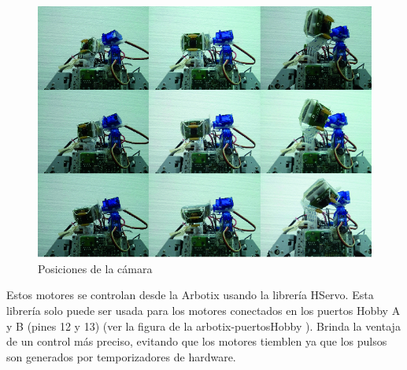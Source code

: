 \begin{figure}[hbtp]
\centering
\includegraphics[scale=0.5]{imagenes/Pantallazo.png}
\caption{Posiciones de la cámara  }
\end{figure}

Estos motores se controlan desde la Arbotix usando la librería HServo. Esta librería solo puede ser usada para los motores conectados en los puertos Hobby A y B (pines 12 y 13) (ver la figura de la arbotix-puertosHobby ). Brinda la ventaja de un control más preciso, evitando que los motores tiemblen ya que los pulsos son generados por temporizadores de hardware. 

